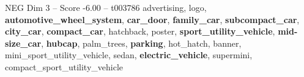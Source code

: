 \begin{textsample}{NEG Dim 3 – Score -6.00 – t003786}  \label{ex:f3_neg_016}
advertising, logo, \textbf{automotive\_wheel\_system}, \textbf{car\_door}, \textbf{family\_car}, \textbf{subcompact\_car}, \textbf{city\_car}, \textbf{compact\_car}, hatchback, poster, \textbf{sport\_utility\_vehicle}, \textbf{mid-size\_car}, \textbf{hubcap}, palm\_trees, \textbf{parking}, hot\_hatch, banner, mini\_sport\_utility\_vehicle, sedan, \textbf{electric\_vehicle}, supermini, compact\_sport\_utility\_vehicle

\end{textsample}
